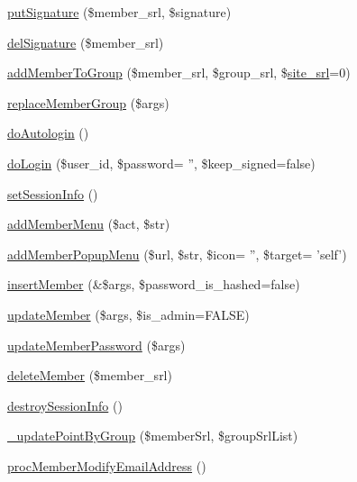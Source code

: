 \begin{DoxyCompactItemize}
\hyperlink{classmemberController_a084c3af4daea1a860f95e06f2bc5fc28}{put\+Signature} (\$member\+\_\+srl, \$signature)
\item 
\hyperlink{classmemberController_a0fa2ec662eb7a40333ca2049a103385e}{del\+Signature} (\$member\+\_\+srl)
\item 
\hyperlink{classmemberController_aca7533f0e95df7227073436c24827c7b}{add\+Member\+To\+Group} (\$member\+\_\+srl, \$group\+\_\+srl, \$\hyperlink{ko_8install_8php_a8b1406b4ad1048041558dce6bfe89004}{site\+\_\+srl}=0)
\item 
\hyperlink{classmemberController_acc92443cdd02e55cec12099722482737}{replace\+Member\+Group} (\$args)
\item 
\hyperlink{classmemberController_aeb2590d01346c9a25c2b22f99429f6a3}{do\+Autologin} ()
\item 
\hyperlink{classmemberController_a92930ff9a5763ef9d6d292c7154269e4}{do\+Login} (\$user\+\_\+id, \$password= '', \$keep\+\_\+signed=false)
\item 
\hyperlink{classmemberController_ae4175b4a60e0b3000ed12e36508720ad}{set\+Session\+Info} ()
\item 
\hyperlink{classmemberController_aaa52725f8ba9ba16cfe4b350a51d7420}{add\+Member\+Menu} (\$act, \$str)
\item 
\hyperlink{classmemberController_a91303fbd27713d1990f88b8dd3c09b2b}{add\+Member\+Popup\+Menu} (\$url, \$str, \$icon= '', \$target= 'self')
\item 
\hyperlink{classmemberController_ae588324b8e86b9259e40d104b4d2b42d}{insert\+Member} (\&\$args, \$password\+\_\+is\+\_\+hashed=false)
\item 
\hyperlink{classmemberController_ac1ad3397eda0a695046b023a14d25496}{update\+Member} (\$args, \$is\+\_\+admin=F\+A\+L\+S\+E)
\item 
\hyperlink{classmemberController_aed05d2a367f7e7a5b70fcbd0b4a08e74}{update\+Member\+Password} (\$args)
\item 
\hyperlink{classmemberController_a5170b3fafc449f4cc6fc599c093fcc06}{delete\+Member} (\$member\+\_\+srl)
\item 
\hyperlink{classmemberController_ac259eb5e2f5ea0b7e747608fa1a308bd}{destroy\+Session\+Info} ()
\item 
\hyperlink{classmemberController_abe9b21621506198b75656781e6919dba}{\+\_\+update\+Point\+By\+Group} (\$member\+Srl, \$group\+Srl\+List)
\item 
\hyperlink{classmemberController_ac5954a875ecc954379437d5c7762fdfe}{proc\+Member\+Modify\+Email\+Address} ()

\end{DoxyCompactItemize}
